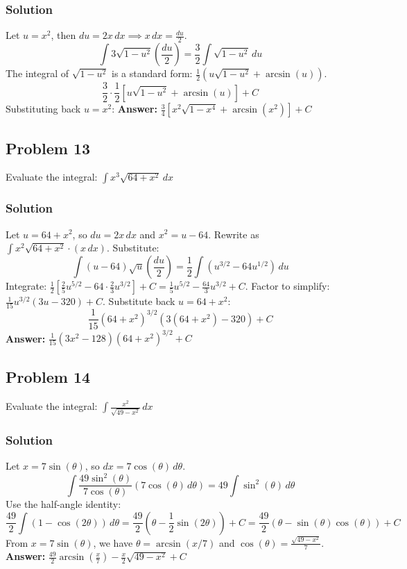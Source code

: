 \documentclass{article}
\begin{document}
\subsubsection*{Solution}
Let $ u = x^2 $, then $ du = 2x \,dx \implies x \,dx = \frac{du}{2} $.
\[ \int 3\sqrt{1 - u^2} \left(\frac{du}{2}\right) = \frac{3}{2} \int \sqrt{1 - u^2} \,du \]
The integral of $ \sqrt{1-u^2} $ is a standard form: $ \frac{1}{2}(u\sqrt{1-u^2} + \arcsin(u)) $.
\[ \frac{3}{2} \cdot \frac{1}{2}[u\sqrt{1 - u^2} + \arcsin(u)] + C \]
Substituting back $ u = x^2 $:
\textbf{Answer:} $ \frac{3}{4}[x^2\sqrt{1 - x^4} + \arcsin(x^2)] + C $
 

\subsection{Problem 13}
Evaluate the integral: $ \int x^3\sqrt{64 + x^2} \,dx $
\subsubsection*{Solution}
Let $ u = 64 + x^2 $, so $ du = 2x \,dx $ and $ x^2 = u - 64 $.
Rewrite as $ \int x^2\sqrt{64 + x^2} \cdot (x \,dx) $. Substitute:
\[ \int (u - 64)\sqrt{u} \left(\frac{du}{2}\right) = \frac{1}{2} \int (u^{3/2} - 64u^{1/2}) \,du \]
Integrate: $ \frac{1}{2}\left[\frac{2}{5}u^{5/2} - 64 \cdot \frac{2}{3}u^{3/2}\right] + C = \frac{1}{5}u^{5/2} - \frac{64}{3}u^{3/2} + C $.
Factor to simplify: $ \frac{1}{15}u^{3/2}(3u - 320) + C $. Substitute back $ u = 64 + x^2 $:
\[ \frac{1}{15}(64+x^2)^{3/2}(3(64+x^2) - 320) + C \]
\textbf{Answer:} $ \frac{1}{15}(3x^2 - 128)(64 + x^2)^{3/2} + C $
 

\subsection{Problem 14}
Evaluate the integral: $ \int \frac{x^2}{\sqrt{49 - x^2}} \,dx $
\subsubsection*{Solution}
Let $ x = 7 \sin(\theta) $, so $ dx = 7 \cos(\theta) \,d\theta $.
\[ \int \frac{49\sin^2(\theta)}{7\cos(\theta)} (7\cos(\theta) \,d\theta) = 49 \int \sin^2(\theta) \,d\theta \]
Use the half-angle identity:
\[ \frac{49}{2} \int (1 - \cos(2\theta)) \,d\theta = \frac{49}{2}\left(\theta - \frac{1}{2}\sin(2\theta)\right) + C = \frac{49}{2}(\theta - \sin(\theta)\cos(\theta)) + C \]
From $ x=7\sin(\theta) $, we have $ \theta=\arcsin(x/7) $ and $ \cos(\theta)=\frac{\sqrt{49-x^2}}{7} $.
\textbf{Answer:} $ \frac{49}{2}\arcsin\left(\frac{x}{7}\right) - \frac{x}{2}\sqrt{49 - x^2} + C $
 
\end{document}
